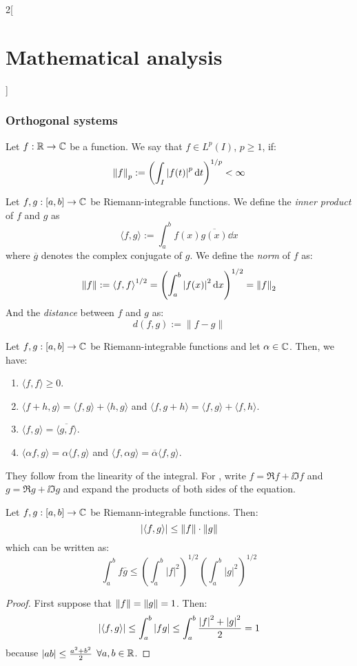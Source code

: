 \documentclass[../../../main_math.tex]{subfiles}
\begin{document}
\begin{multicols}{2}[\section{Mathematical analysis}]
  \subsubsection{Orthogonal systems}
  \begin{definition}
    Let $f:\mathbb{R} \rightarrow\mathbb{C} $ be a function. We say that $f\in L^p(I)$, $p\geq1$, if: $$\left\|f\right\|_p:=\left(\int_I{|f(t)|}^p\dd{t}\right)^{1/p}<\infty$$
  \end{definition}
  \begin{definition}
    Let $f,g:[a,b]\rightarrow\mathbb{C} $ be Riemann-integrable functions. We define the \emph{inner product} of $f$ and $g$ as $$\langle f,g\rangle:=\int_a^bf(x)\overline{g(x)}\dd{x}$$ where $\overline{g}$ denotes the complex conjugate of $g$. We define the \emph{norm} of $f$ as: $$\left\|f\right\|:={\langle f,f\rangle}^{1/2}=\left(\int_a^b{|f(x)|}^2\dd{x}\right)^{1/2}=\left\|f\right\|_2$$ And the \emph{distance} between $f$ and $g$ as: $$d(f,g):=\|f-g\|$$
  \end{definition}
  \begin{proposition}
    Let $f,g:[a,b]\rightarrow\mathbb{C} $ be Riemann-integrable functions and let $\alpha\in\mathbb{C} $. Then, we have:
    \begin{enumerate}
      \item $\langle f,f\rangle\geq 0$.
      \item $\langle f+h,g\rangle=\langle f,g\rangle+\langle h,g\rangle$ and $\langle f,g+h\rangle=\langle f,g\rangle+\langle f,h\rangle$.
            \item\label{MA:orto3} $\langle f,g\rangle=\overline{\langle g,f\rangle}$.
      \item $\langle \alpha f,g\rangle=\alpha\langle f,g\rangle$ and $\langle f,\alpha g\rangle=\overline{\alpha}\langle f,g\rangle$.
    \end{enumerate}
  \end{proposition}
  \begin{sproof}
    They follow from the linearity of the integral. For , write $f=\Re f+\ii \Im f$ and $g=\Re g+\ii \Im g$ and expand the products of both sides of the equation.
  \end{sproof}
  \begin{theorem}\label{MA:cauchyschwarz}
    Let $f,g:[a,b]\rightarrow\mathbb{C} $ be Riemann-integrable functions. Then: $$\abs{\langle f,g\rangle}\leq\left\|f\right\|\cdot\|g\|$$ which can be written as: $$\int_a^bf\overline{g}\leq\left(\int_a^b{|f|}^2\right)^{1/2}\left(\int_a^b{|g|}^2\right)^{1/2}$$
  \end{theorem}
  \begin{proof}
    First suppose that $\left\|f\right\|=\left\|g\right\|=1$. Then:
    $$\abs{\langle f,g\rangle}\leq\int_a^b\abs{fg}\leq\int_a^b\frac{\abs{f}^2+\abs{g}^2}{2}=1$$
    because $\abs{ab}\leq \frac{a^2+b^2}{2}$ $\forall a,b\in\mathbb{R}$.


\end{proof}
\end{multicols}
\end{document}
